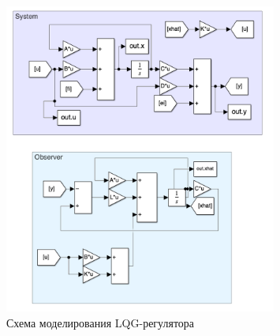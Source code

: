 \begin{figure}[ht!]
    \centering
    \includegraphics[width=0.8\textwidth]{media/lqg_cheme.png}
    \caption{Схема моделирования LQG-регулятора}
    \label{fig:lqg_scheme}
\end{figure}

